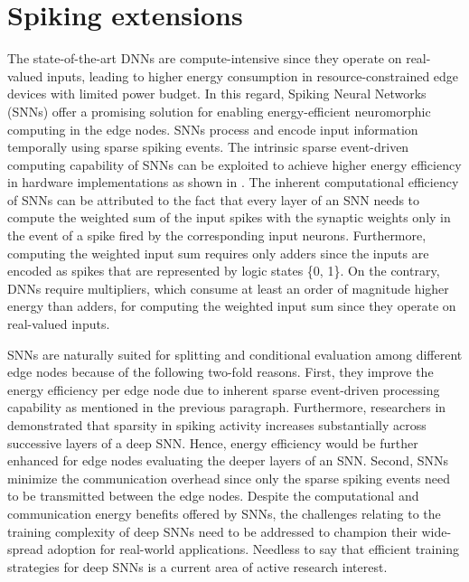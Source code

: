 \section{Spiking extensions}
\label{sec:spiking}
The state-of-the-art DNNs are compute-intensive since they operate on real-valued inputs, leading to higher energy consumption in resource-constrained edge devices with limited power budget. In this regard, Spiking Neural Networks (SNNs) offer a promising solution for enabling energy-efficient neuromorphic computing in the edge nodes. SNNs process and encode input information temporally using sparse spiking events. The intrinsic sparse event-driven computing capability of SNNs can be exploited to achieve higher energy efficiency in hardware implementations as shown in \cite{sengupta2019going, blouw2018benchmarking}. The inherent computational efficiency of SNNs can be attributed to the fact that every layer of an SNN needs to compute the weighted sum of the input spikes with the synaptic weights only in the event of a spike fired by the corresponding input neurons. Furthermore, computing the weighted input sum requires only adders since the inputs are encoded as spikes that are represented by logic states \{0, 1\}. On the contrary, DNNs require multipliers, which consume at least an order of magnitude higher energy than adders, for computing the weighted input sum since they operate on real-valued inputs.

SNNs are naturally suited for splitting and conditional evaluation among different edge nodes because of the following two-fold reasons. First, they improve the energy efficiency per edge node due to inherent sparse event-driven processing capability as mentioned in the previous paragraph. Furthermore, researchers in \cite{sengupta2019going} demonstrated that sparsity in spiking activity increases substantially across successive layers of a deep SNN. Hence, energy efficiency would be further enhanced for edge nodes evaluating the deeper layers of an SNN. Second, SNNs minimize the communication overhead since only the sparse spiking events need to be transmitted between the edge nodes. Despite the computational and communication energy benefits offered by SNNs, the challenges relating to the training complexity of deep SNNs need to be addressed to champion their wide-spread adoption for real-world applications. Needless to say that efficient training strategies for deep SNNs is a current area of active research interest.

